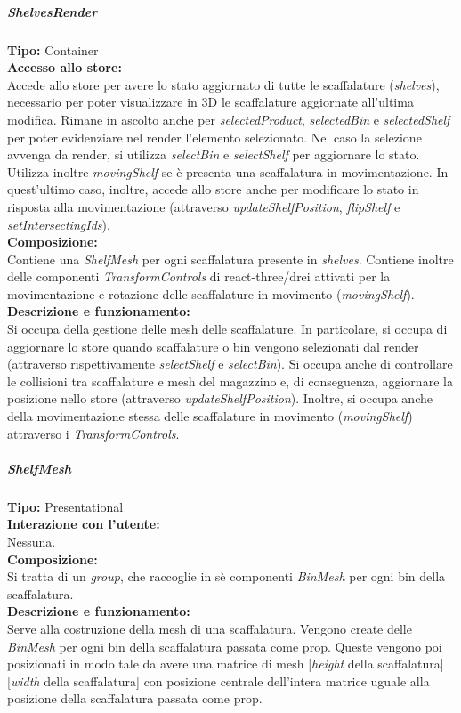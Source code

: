 \subparagraph{\colorbox{verde_uml}{ShelvesRender}}
\textbf{Tipo:} Container \\
\textbf{Accesso allo store:} \\
Accede allo store per avere lo stato aggiornato di tutte le scaffalature (\textit{shelves}), necessario per poter visualizzare in 3D le scaffalature aggiornate all'ultima modifica. Rimane in ascolto anche per \textit{selectedProduct}, \textit{selectedBin} e \textit{selectedShelf} per poter evidenziare nel render l'elemento selezionato. Nel caso la selezione avvenga da render, si utilizza \textit{selectBin} e \textit{selectShelf} per aggiornare lo stato. Utilizza inoltre \textit{movingShelf} se è presenta una scaffalatura in movimentazione. In quest'ultimo caso, inoltre, accede allo store anche per modificare lo stato in risposta alla movimentazione (attraverso \textit{updateShelfPosition}, \textit{flipShelf} e \textit{setIntersectingIds}).\\
\textbf{Composizione:} \\
Contiene una \textit{ShelfMesh} per ogni scaffalatura presente in \textit{shelves}. Contiene inoltre delle componenti \textit{TransformControls} di react-three/drei attivati per la movimentazione e rotazione delle scaffalature in movimento (\textit{movingShelf}).\\
\textbf{Descrizione e funzionamento:} \\
Si occupa della gestione delle mesh delle scaffalature. 
In particolare, si occupa di aggiornare lo store quando scaffalature o bin vengono selezionati dal render (attraverso rispettivamente \textit{selectShelf} e \textit{selectBin}). Si occupa anche di controllare le collisioni tra scaffalature e mesh del magazzino e, di conseguenza, aggiornare la posizione nello store (attraverso \textit{updateShelfPosition}). Inoltre, si occupa anche della movimentazione stessa delle scaffalature in movimento (\textit{movingShelf}) attraverso i \textit{TransformControls}.

\subparagraph{\colorbox{verde_uml}{ShelfMesh}}
\textbf{Tipo:} Presentational \\
\textbf{Interazione con l'utente:} \\
Nessuna.\\
\textbf{Composizione:} \\
Si tratta di un \textit{group}, che raccoglie in sè componenti \textit{BinMesh} per ogni bin della scaffalatura.\\
\textbf{Descrizione e funzionamento:} \\
Serve alla costruzione della mesh di una scaffalatura. Vengono create delle \textit{BinMesh} per ogni bin della scaffalatura passata come prop. Queste vengono poi posizionati in modo tale da avere una matrice di mesh [\textit{height} della scaffalatura][\textit{width} della scaffalatura] con posizione centrale dell'intera matrice uguale alla posizione della scaffalatura passata come prop. 

